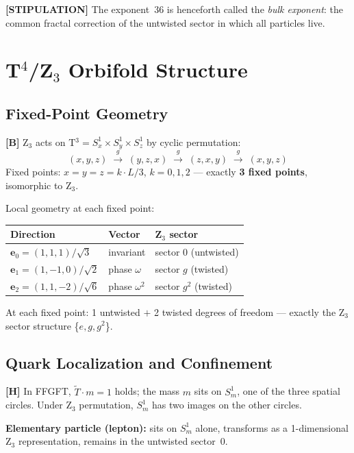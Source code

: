 \textbf{[STIPULATION]} The exponent~36 is henceforth called the
\emph{bulk exponent}: the common fractal correction of the untwisted
sector in which all particles live.

\section{T$^4$/Z$_3$ Orbifold Structure}

\subsection{Fixed-Point Geometry}

\textbf{[B]} Z$_3$ acts on T$^3 = S^1_x \times S^1_y \times S^1_z$ by
cyclic permutation:
\[
  (x,y,z) \;\xrightarrow{g}\; (y,z,x) \;\xrightarrow{g}\; (z,x,y)
  \;\xrightarrow{g}\; (x,y,z)
\]
Fixed points: $x = y = z = k\cdot L/3$, $k = 0,1,2$ --- exactly
\textbf{3 fixed points}, isomorphic to Z$_3$.

Local geometry at each fixed point:
\begin{center}
\renewcommand{\arraystretch}{1.3}
{\small\begin{tabular}{lll}
\toprule
Direction & Vector & Z$_3$ sector \\
\midrule
$\mathbf{e}_0 = (1,1,1)/\sqrt{3}$   & invariant   & sector 0 (untwisted) \\
$\mathbf{e}_1 = (1,-1,0)/\sqrt{2}$  & phase $\omega$   & sector $g$ (twisted) \\
$\mathbf{e}_2 = (1,1,-2)/\sqrt{6}$  & phase $\omega^2$ & sector $g^2$ (twisted) \\
\bottomrule
\end{tabular}}
\renewcommand{\arraystretch}{1.0}
\end{center}
At each fixed point: 1 untwisted $+$ 2 twisted degrees of freedom ---
exactly the Z$_3$ sector structure \{$e, g, g^2$\}.

\subsection{Quark Localization and Confinement}

\textbf{[H]} In FFGFT, $\tilde{T}\cdot m = 1$ holds; the mass $m$ sits
on $S^1_m$, one of the three spatial circles. Under Z$_3$ permutation,
$S^1_m$ has two images on the other circles.

\textbf{Elementary particle (lepton):} sits on $S^1_m$ alone,
transforms as a 1-dimensional Z$_3$ representation, remains in the
untwisted sector~0.

